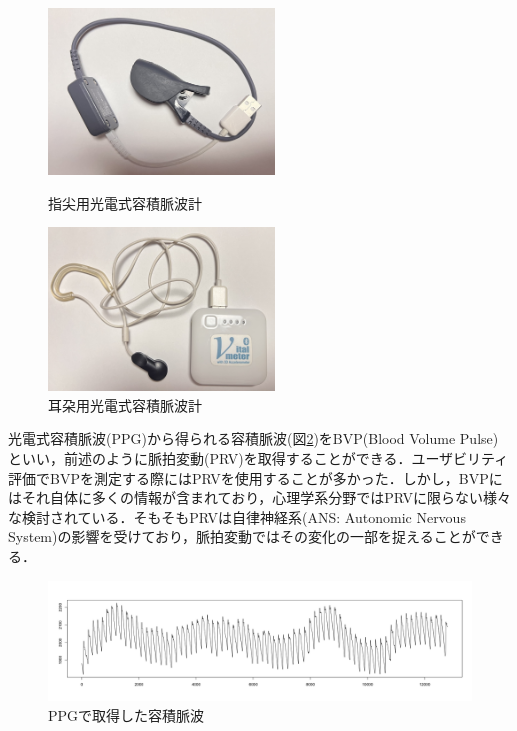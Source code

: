 \begin{figure}[htbp]
\begin{minipage}{0.5\hsize}
    \begin{center}
       \includegraphics[width=60mm]{img/device2.jpg}
    \end{center}
    \caption{指尖用光電式容積脈波計}
    \label{fig:device2}
  \end{minipage}
  \begin{minipage}{0.5\hsize}
    \begin{center}
       \includegraphics[width=60mm]{img/device1.jpg}
    \end{center}
    \caption{耳朶用光電式容積脈波計}
    \label{fig:device1}
  \end{minipage}
\end{figure}

光電式容積脈波(PPG)から得られる容積脈波(図\ref{fig:bvpfukuinone})をBVP(Blood Volume Pulse)といい，前述のように脈拍変動(PRV)を取得することができる．ユーザビリティ評価でBVPを測定する際にはPRVを使用することが多かった．しかし，BVPにはそれ自体に多くの情報が含まれており，心理学系分野ではPRVに限らない様々な検討されている．そもそもPRVは自律神経系(ANS: Autonomic Nervous System)の影響を受けており，脈拍変動ではその変化の一部を捉えることができる\cite{peper}．

\begin{figure}[htbp]
    \begin{center}
       \includegraphics[width=\linewidth]{img/bvp_fukui_none.png}
    \end{center}
    \caption{PPGで取得した容積脈波}
    \label{fig:bvpfukuinone}
\end{figure}

